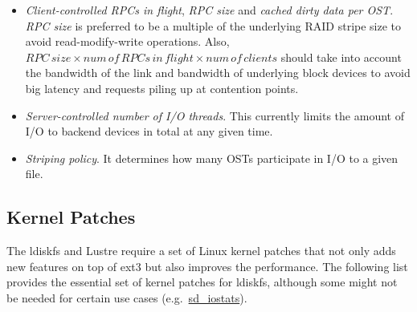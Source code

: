 \begin{itemize}

\item \textit{Client-controlled RPCs in flight}, \textit{RPC size} and
\textit{cached dirty data per OST}.  \textit{RPC size} is preferred to be a
multiple of the underlying RAID stripe size to avoid read-modify-write
operations. Also, $RPC\,size \times num\,of\,RPCs\,in\,flight \times
num\,of\,clients$ should take into account the bandwidth of the link and
bandwidth of underlying block devices to avoid big latency and requests piling
up at contention points.

\item \textit{Server-controlled number of I/O threads}. This currently limits the
amount of I/O to backend devices in total at any given time.

\item \textit{Striping policy}. It determines how many OSTs participate in I/O
to a given file.

\end{itemize}

\subsection{Kernel Patches}
\label{ldiskfs-kernel-patches}

The ldiskfs and Lustre require a set of Linux kernel patches that not only adds new
features on top of ext3 but also improves the performance. The following list provides
the essential set of kernel patches for ldiskfs, although some might not be
needed for certain use cases (e.g.~\url{sd_iostats}).

